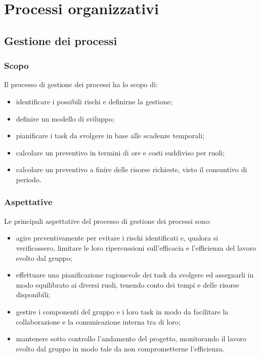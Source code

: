 \section{Processi organizzativi}

\subsection{Gestione dei processi}

	\subsubsection{Scopo}

		Il processo di gestione dei processi ha lo scopo di:

		\begin{itemize}
			\item identificare i possibili rischi e definirne la gestione;
			\item definire un modello di sviluppo;
			\item pianificare i task da svolgere in base alle scadenze temporali;
			\item calcolare un preventivo in termini di ore e costi suddiviso per ruoli;
			\item calcolare un preventivo a finire delle risorse richieste, visto il consuntivo di periodo.
		\end{itemize}

	\subsubsection{Aspettative}

		Le principali aspettative del processo di gestione dei processi sono:

		\begin{itemize}
			\item agire preventivamente per evitare i rischi identificati e, qualora si verificassero, limitare le loro ripercussioni sull'efficacia e l'efficienza del lavoro svolto dal gruppo;
			\item effettuare una pianificazione ragionevole dei task da svolgere ed assegnarli in modo equilibrato ai diversi ruoli, tenendo conto dei tempi e delle risorse disponibili;
			\item gestire i componenti del gruppo e i loro task in modo da facilitare la collaborazione e la comunicazione interna tra di loro;
			\item mantenere sotto controllo l'andamento del progetto, monitorando il lavoro svolto dal gruppo in modo tale da non comprometterne l'efficienza.
		\end{itemize}

